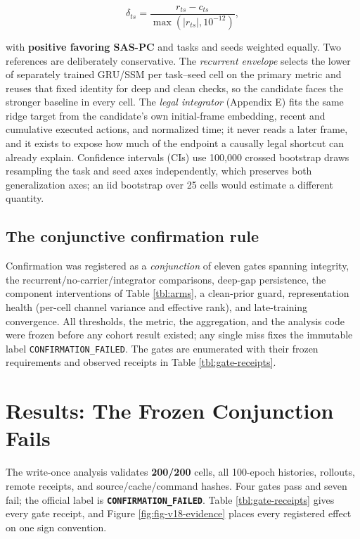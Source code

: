 \begin{equation}\delta_{ts}=\frac{r_{ts}-c_{ts}}{\max(|r_{ts}|,10^{-12})},
\label{eq:effect}\end{equation}

with \textbf{positive favoring SAS-PC} and tasks and seeds weighted
equally. Two references are deliberately conservative. The
\emph{recurrent envelope} selects the lower of separately trained
GRU/SSM per task--seed cell on the primary metric and reuses that fixed
identity for deep and clean checks, so the candidate faces the stronger
baseline in every cell. The \emph{legal integrator} (Appendix E) fits
the same ridge target from the candidate's own initial-frame embedding,
recent and cumulative executed actions, and normalized time; it never
reads a later frame, and it exists to expose how much of the endpoint a
causally legal shortcut can already explain. Confidence intervals (CIs)
use 100,000 crossed bootstrap draws resampling the task and seed axes
independently, which preserves both generalization axes; an iid
bootstrap over 25 cells would estimate a different quantity.

\subsection{The conjunctive confirmation
rule}\label{the-conjunctive-confirmation-rule}

Confirmation was registered as a \emph{conjunction} of eleven gates
spanning integrity, the recurrent/no-carrier/integrator comparisons,
deep-gap persistence, the component interventions of Table
\ref{tbl:arms}, a clean-prior guard, representation health (per-cell
channel variance and effective rank), and late-training convergence. All
thresholds, the metric, the aggregation, and the analysis code were
frozen before any cohort result existed; any single miss fixes the
immutable label \texttt{CONFIRMATION\_FAILED}. The gates are enumerated
with their frozen requirements and observed receipts in Table
\ref{tbl:gate-receipts}.

\section{Results: The Frozen Conjunction
Fails}\label{results-the-frozen-conjunction-fails}

The write-once analysis validates \textbf{200/200} cells, all 100-epoch
histories, rollouts, remote receipts, and source/cache/command hashes.
Four gates pass and seven fail; the official label is
\textbf{\texttt{CONFIRMATION\_FAILED}}. Table \ref{tbl:gate-receipts}
gives every gate receipt, and Figure \ref{fig:fig-v18-evidence} places
every registered effect on one sign convention.

